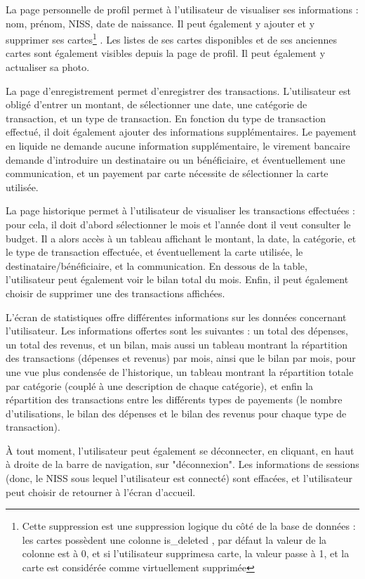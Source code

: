 \documentclass[a4paper,12pt]{article}
\begin{document}
La page personnelle de profil permet à l'utilisateur de visualiser ses informations : nom, prénom, NISS, date de naissance. Il peut également y ajouter et y supprimer ses cartes\footnote{Cette suppression est une suppression logique du côté de la base de données : les cartes possèdent une colonne is\_deleted , par défaut la valeur de la colonne est à 0, et si l'utilisateur \og supprime\fg sa carte, la valeur passe à 1, et la carte est considérée comme virtuellement supprimée} . Les listes de ses cartes disponibles et de ses anciennes cartes sont également visibles depuis la page de profil. Il peut également y actualiser sa photo.

La page d'enregistrement permet d'enregistrer des transactions. L'utilisateur est obligé d'entrer un montant, de sélectionner une date, une catégorie de transaction, et un type de transaction. En fonction du type de transaction effectué, il doit également ajouter des informations supplémentaires. Le payement en liquide ne demande aucune information supplémentaire, le virement bancaire demande d'introduire un destinataire ou un bénéficiaire, et éventuellement une communication, et un payement par carte nécessite de sélectionner la carte utilisée.

La page historique permet à l'utilisateur de visualiser les transactions effectuées : pour cela, il doit d'abord sélectionner le mois et l'année dont il veut consulter le budget. Il a alors accès à un tableau affichant le montant, la date, la catégorie, et le type de transaction effectuée, et éventuellement la carte utilisée, le destinataire/bénéficiaire, et la communication. En dessous de la table, l'utilisateur peut également voir le bilan total du mois. Enfin, il peut également choisir de supprimer une des transactions affichées.

L'écran de statistiques offre différentes informations sur les données concernant l'utilisateur. Les informations offertes sont les suivantes : un total des dépenses, un total des revenus, et un bilan, mais aussi un tableau montrant la répartition des transactions (dépenses et revenus) par mois, ainsi que le bilan par mois, pour une vue plus condensée de l'historique, un tableau montrant la répartition totale par catégorie (couplé à une description de chaque catégorie), et  enfin la répartition des transactions entre les différents types de payements (le nombre d'utilisations, le bilan des dépenses et le bilan des revenus pour chaque type de transaction).

À tout moment, l'utilisateur peut également se déconnecter, en cliquant, en haut à droite de la barre de navigation, sur "déconnexion". Les informations de sessions (donc, le NISS sous lequel l'utilisateur est connecté) sont effacées, et l'utilisateur peut choisir de retourner à l'écran d'accueil.
\end{document}
